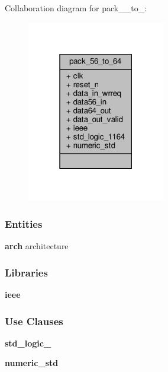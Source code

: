 Collaboration diagram for pack\+\_\+\_\+to\+\_\+:\nopagebreak
\begin{figure}[H]
\begin{center}
\leavevmode
\includegraphics[width=171pt]{df/d2f/classpack__56__to__64__coll__graph}
\end{center}
\end{figure}
\subsubsection*{Entities}
\begin{DoxyCompactItemize}
\item 
{\bf arch} architecture
\end{DoxyCompactItemize}
\subsubsection*{Libraries}
 \begin{DoxyCompactItemize}
\item 
{\bf ieee} 
\end{DoxyCompactItemize}
\subsubsection*{Use Clauses}
 \begin{DoxyCompactItemize}
\item 
{\bf std\+\_\+logic\+\_}   
\item 
{\bf numeric\+\_\+std}   
\end{DoxyCompactItemize}
